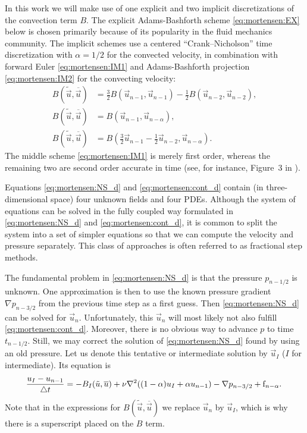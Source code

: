 In this work we will make use of one explicit and two implicit
discretizations of the convection term $B$.  The explicit
Adams-Bashforth scheme \eqref{eq:mortensen:EX} below is chosen
primarily because of its popularity in the fluid mechanics
community. The implicit schemes use a centered ``Crank--Nicholson''
time discretization with $\alpha=1/2$ for the convected velocity, in
combination with forward Euler \eqref{eq:mortensen:IM1} and
Adams-Bashforth projection \eqref{eq:mortensen:IM2} for the convecting
velocity:
\begin{align}
\label{eq:mortensen:EX}
B(\tilde{\vec{u}},\overline{\vec{u}}) &=
\frac{3}{2}B(\vec{u}_{n-1},\vec{u}_{n-1})-
\frac{1}{2}B(\vec{u}_{n-2},\vec{u}_{n-2}),
\\
\label{eq:mortensen:IM1}
B(\tilde{\vec{u}},\overline{\vec{u}}) &=
B(\vec{u}_{n-1},\vec{u}_{n-\alpha}),
\\
 \label{eq:mortensen:IM2}
B(\tilde{\vec{u}},\overline{\vec{u}}) &=
B(\frac{3}{2}\vec{u}_{n-1}-\frac{1}{2}\vec{u}_{n-2},\vec{u}_{n-\alpha}).
\end{align}
The middle scheme \eqref{eq:mortensen:IM1} is merely first order,
whereas the remaining two are second order accurate in time (see, for
instance, Figure~3 in \citet{SimoArmero1994}).

Equations \eqref{eq:mortensen:NS_d} and \eqref{eq:mortensen:cont_d}
contain (in three-dimensional space) four unknown fields and four
PDEs.  Although the system of equations can be solved in the fully
coupled way formulated in \eqref{eq:mortensen:NS_d} and
\eqref{eq:mortensen:cont_d}, it is common to split the system into a
set of simpler equations so that we can compute the velocity and
pressure separately.  This class of approaches is often referred to as
fractional step methods.

The fundamental problem in \eqref{eq:mortensen:NS_d} is that the
pressure $p_{n-1/2}$ is unknown. One approximation is then to use the
known pressure gradient $\nabla p_{n-3/2}$ from the previous time step
as a first guess. Then \eqref{eq:mortensen:NS_d} can be solved for
$\vec{u}_n$. Unfortunately, this $\vec{u}_n$ will most likely not also
fulfill \eqref{eq:mortensen:cont_d}. Moreover, there is no obvious way
to advance $p$ to time $t_{n-1/2}$. Still, we may correct the solution
of \eqref{eq:mortensen:NS_d} found by using an old pressure. Let us
denote this tentative or intermediate solution by $\vec{u}_I$ ($I$ for
intermediate). Its equation is
\begin{equation}
\label{eq:mortensen:NS_FS}
\frac{{\vec{u}}_{I}-\vec{u}_{n-1}}{\triangle t} =
- B_I(\tilde{\vec{u}},\overline{\vec{u}}) +
\nu \nabla^2 ((1-\alpha) {\vec{u}}_{I} + \alpha \vec{u}_{n-1})
-\nabla p_{n-3/2} + \text{f}_{n-\alpha} . \thinspace
\end{equation}
Note that in the expressions for
$B(\tilde{\vec{u}},\overline{\vec{u}})$ we replace $\vec{u}_n$ by
$\vec{u}_I$, which is why there is a superscript placed on the $B$
term.

